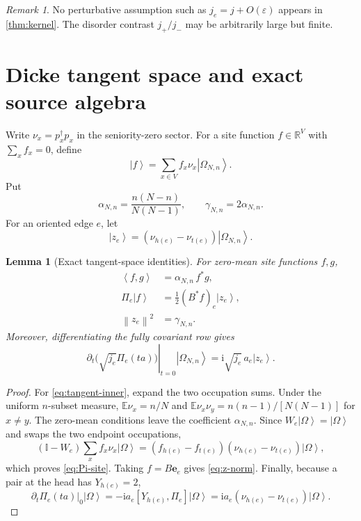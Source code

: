 \documentclass[11pt]{article}
\newtheorem{lemma}[theorem]{Lemma}
\theoremstyle{definition}
\theoremstyle{remark}
\newtheorem{remark}[theorem]{Remark}
\newcommand{\ket}[1]{\left|#1\right\rangle}
\newcommand{\I}{\mathrm i}
\newcommand{\Id}{\mathbb I}
\newcommand{\R}{\mathbb R}
\newcommand{\E}{\mathbb E}
\newcommand{\ip}[2]{\left\langle #1,#2\right\rangle}
\newcommand{\norm}[1]{\left\lVert #1\right\rVert}
\newcommand{\eps}{\varepsilon}
\begin{document}
\begin{remark}
No perturbative assumption such as $j_e=j+O(\eps)$ appears in \cref{thm:kernel}.  The disorder contrast $j_+/j_-$ may be arbitrarily large but finite.
\end{remark}

\section{Dicke tangent space and exact source algebra}
\label{sec:source-algebra}

Write $\nu_x=p_x^\dagger p_x$ in the seniority-zero sector.  For a site function $f\in\R^V$ with $\sum_xf_x=0$, define
\begin{equation}
 \ket f=\sum_{x\in V}f_x\nu_x\ket{\Omega_{N,n}}.
 \label{eq:site-state}
\end{equation}
Put
\begin{equation}
 \alpha_{N,n}=\frac{n(N-n)}{N(N-1)},
 \qquad
 \gamma_{N,n}=2\alpha_{N,n}.
 \label{eq:alpha-gamma}
\end{equation}
For an oriented edge $e$, let
\begin{equation}
 \ket{z_e}=(\nu_{h(e)}-\nu_{t(e)})\ket{\Omega_{N,n}}.
 \label{eq:zedge}
\end{equation}

\begin{lemma}[Exact tangent-space identities]
\label{lem:tangent}
For zero-mean site functions $f,g$,
\begin{align}
 \ip f g&=\alpha_{N,n}\,f^*g,
 \label{eq:tangent-inner}\\
 \Pi_e\ket f&=\frac12(B^*f)_e\ket{z_e},
 \label{eq:Pi-site}\\
 \norm{z_e}^2&=\gamma_{N,n}.
 \label{eq:z-norm}
\end{align}
Moreover, differentiating the fully covariant row gives
\begin{equation}
 \left.\partial_t\bigl(\sqrt{j_e}\Pi_e(ta)\bigr)\right|_{t=0}
 \ket{\Omega_{N,n}}
 =\I\sqrt{j_e}\,a_e\ket{z_e}.
 \label{eq:weighted-source}
\end{equation}
\end{lemma}

\begin{proof}
For \eqref{eq:tangent-inner}, expand the two occupation sums.  Under the uniform $n$-subset measure, $\E\nu_x=n/N$ and $\E\nu_x\nu_y=n(n-1)/[N(N-1)]$ for $x\ne y$.  The zero-mean conditions leave the coefficient $\alpha_{N,n}$.  Since $W_e\ket\Omega=\ket\Omega$ and swaps the two endpoint occupations,
\[
 (\Id-W_e)\sum_xf_x\nu_x\ket\Omega
 =(f_{h(e)}-f_{t(e)})(\nu_{h(e)}-\nu_{t(e)})\ket\Omega,
\]
which proves \eqref{eq:Pi-site}.  Taking $f=B\mathbf e_e$ gives \eqref{eq:z-norm}.  Finally, because a pair at the head has $Y_{h(e)}=2$,
\[
 \left.\partial_t\Pi_e(ta)\right|_0\ket\Omega
 =-\I a_e[Y_{h(e)},\Pi_e]\ket\Omega
 =\I a_e(\nu_{h(e)}-\nu_{t(e)})\ket\Omega.
\]
\end{proof}
\end{document}
